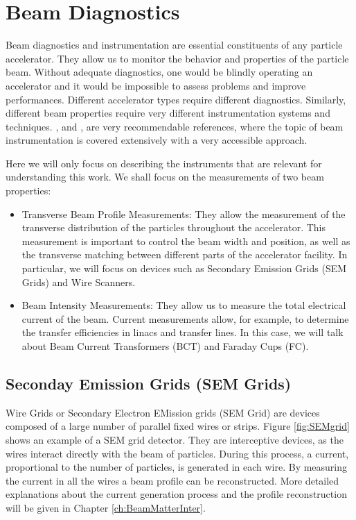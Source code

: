 \section{Beam Diagnostics}
\label{sec:BeamDiag}

Beam diagnostics and instrumentation are essential constituents of any particle accelerator. They allow us to monitor the behavior and properties of the particle beam. Without adequate diagnostics, one would be blindly operating an accelerator and it would be impossible to assess problems and improve performances. Different accelerator types require different diagnostics. Similarly, different beam properties require very different instrumentation systems and techniques.  \parencite*[][]{ref:BeamInstrumentationBook}, \parencite*[][]{ref:NotesBeamInst} and \parencite*[][]{ref:CASbeamInst}, are very recommendable references, where the topic of beam instrumentation is covered extensively with a very accessible approach. 

Here we will only focus on describing the instruments that are relevant for understanding this work. We shall focus on the measurements of two beam properties: 

\begin{itemize}
    \item Transverse Beam Profile Measurements: They allow the measurement of the transverse distribution of the particles throughout the accelerator. This measurement is important to control the beam width and position, as well as the transverse matching between different parts of the accelerator facility. In particular, we will focus on devices such as Secondary Emission Grids (SEM Grids) and Wire Scanners. 
    \item Beam Intensity Measurements: They allow us to measure the total electrical current of the beam. Current measurements allow, for example, to determine the transfer efficiencies in linacs and transfer lines. In this case, we will talk about Beam Current Transformers (BCT) and Faraday Cups (FC).
\end{itemize}

\subsection{Seconday Emission Grids (SEM Grids)}
\label{sec:SEMgrids}

Wire Grids or Secondary Electron EMission grids (SEM Grid) are devices composed of a large number of parallel fixed wires or strips. Figure \ref{fig:SEMgrid} shows an example of a SEM grid detector. They are interceptive devices, as the wires interact directly with the beam of particles. During this process, a current, proportional to the number of particles, is generated in each wire.  By measuring the current in all the wires a beam profile can be reconstructed. More detailed explanations about the current generation process and the profile reconstruction will be given in Chapter \ref{ch:BeamMatterInter}.


